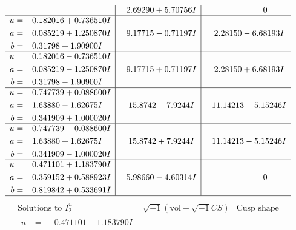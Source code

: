 \documentclass[1p]{elsarticle_modified}
\theoremstyle{definition}
\newcommand{\I}{\sqrt{-1}}
\begin{document}
$$\begin{array}{c|c|c}
 & \phantom{-}2.69290 + 5.70756 I & \phantom{-0.000000 } 0 \\ \hline\begin{aligned}
u &= \phantom{-}0.182016 + 0.736510 I \\
a &= \phantom{-}0.085219 + 1.250870 I \\
b &= \phantom{-}0.31798 + 1.90900 I\end{aligned}
 & \phantom{-}9.17715 - 0.71197 I & \phantom{-}2.28150 - 6.68193 I \\ \hline\begin{aligned}
u &= \phantom{-}0.182016 - 0.736510 I \\
a &= \phantom{-}0.085219 - 1.250870 I \\
b &= \phantom{-}0.31798 - 1.90900 I\end{aligned}
 & \phantom{-}9.17715 + 0.71197 I & \phantom{-}2.28150 + 6.68193 I \\ \hline\begin{aligned}
u &= \phantom{-}0.747739 + 0.088600 I \\
a &= \phantom{-}1.63880 - 1.62675 I \\
b &= \phantom{-}0.341909 + 1.000020 I\end{aligned}
 & \phantom{-}15.8742 - 7.9244 I & \phantom{-}11.14213 + 5.15246 I \\ \hline\begin{aligned}
u &= \phantom{-}0.747739 - 0.088600 I \\
a &= \phantom{-}1.63880 + 1.62675 I \\
b &= \phantom{-}0.341909 - 1.000020 I\end{aligned}
 & \phantom{-}15.8742 + 7.9244 I & \phantom{-}11.14213 - 5.15246 I \\ \hline\begin{aligned}
u &= \phantom{-}0.471101 + 1.183790 I \\
a &= \phantom{-}0.359152 + 0.588923 I \\
b &= \phantom{-}0.819842 + 0.533691 I\end{aligned}
 & \phantom{-}5.98660 - 4.60314 I & \phantom{-0.000000 } 0\\
 \hline 
 \end{array}$$\newpage$$\begin{array}{c|c|c}  
\text{Solutions to }I^u_{2}& \I (\text{vol} + \sqrt{-1}CS) & \text{Cusp shape}\\
 \hline 
\begin{aligned}
u &= \phantom{-}0.471101 - 1.183790 I \\

\end{aligned}
\end{array}$$
\end{document}
